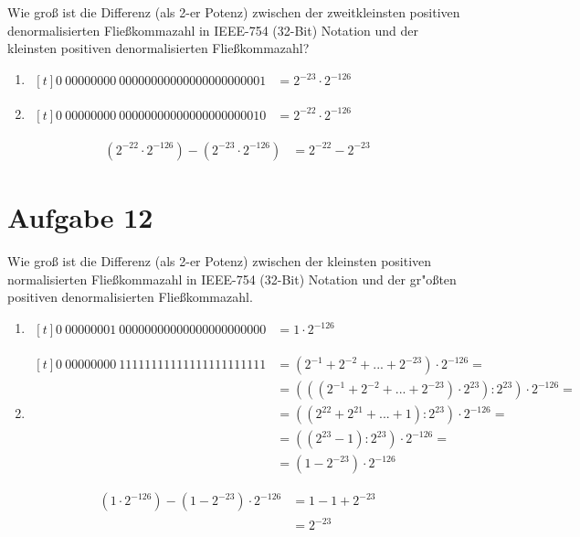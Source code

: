 \documentclass[10pt, oneside]{article}
\begin{document}
Wie gro{\ss} ist die Differenz (als 2-er Potenz) zwischen der zweitkleinsten
positiven denormalisierten Flie{\ss}kommazahl in IEEE-754 (32-Bit) Notation und
der kleinsten positiven denormalisierten Flie{\ss}kommazahl?
\begin{enumerate}
    \item $\begin{aligned}[t]
            0\ 00000000\ 00000000000000000000001 &= 2^{-23} \cdot 2^{-126}
        \end{aligned}$
    \item $\begin{aligned}[t]
            0\ 00000000\ 00000000000000000000010 &= 2^{-22} \cdot 2^{-126}
        \end{aligned}$
\end{enumerate}
\begin{align*}
     (2^{-22} \cdot 2^{-126}) - (2^{-23} \cdot 2^{-126}) &= 2^{-22} - 2^{-23}
\end{align*}

\pagebreak
\section{Aufgabe 12}

Wie gro{\ss} ist die Differenz (als 2-er Potenz) zwischen der kleinsten
positiven normalisierten Flie{\ss}kommazahl in IEEE-754 (32-Bit) Notation und
der gr"o{\ss}ten positiven denormalisierten Flie{\ss}kommazahl.
\begin{enumerate}
    \item $\begin{aligned}[t]
            0\ 00000001\ 00000000000000000000000 &= 1 \cdot 2^{-126}
        \end{aligned}$
    \item $\begin{aligned}[t]
            0\ 00000000\ 11111111111111111111111 &= (2^{-1} + 2^{-2} + ... + 2^{-23}) \cdot 2^{-126} = \\
                                                 &= (((2^{-1} + 2^{-2} + ... + 2^{-23}) \cdot 2^{23}) : 2^{23}) \cdot 2^{-126} = \\
                                                 &= ((2^{22} + 2^{21} + ... + 1) : 2^{23}) \cdot 2^{-126} = \\
                                                 &= ((2^23 - 1) : 2^{23}) \cdot 2^{-126} = \\
                                                 &= (1 - 2^{-23}) \cdot 2^{-126}
        \end{aligned}$
\end{enumerate}
\begin{align*}
    (1 \cdot 2^{-126}) - (1 - 2^{-23}) \cdot 2^{-126} &= 1 - 1 + 2^{-23} \\
                                                      &= 2^{-23}
\end{align*}
\end{document}
